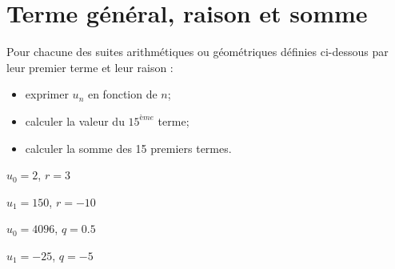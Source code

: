 %		
%	
%		
%		
%	
	
\section{Terme général, raison et somme}

Pour chacune des suites arithmétiques ou géométriques définies ci-dessous par leur premier terme et leur raison :
\begin{itemize}
	\item exprimer $u_n$ en fonction de $n$;
	\item calculer la valeur du $15^{ème}$ terme;
	\item calculer la somme des 15 premiers termes.
	
\end{itemize} 
\begin{questions}

	
	\question[2\half] $u_0 = 2$, $r= 3$
	
	\fillwithdottedlines{8cm}
	
	
	\question[2\half] $u_1 = 150$, $r= -10$
	
	\fillwithdottedlines{8cm}
	
	\question[2\half] $u_0 = 4096$, $q=\num{0.5}$
	
	\fillwithdottedlines{9cm}
	
	\question[2\half] $u_1 = -25$, $q=\num{-5}$
	
	\fillwithdottedlines{9cm}
\end{questions}

